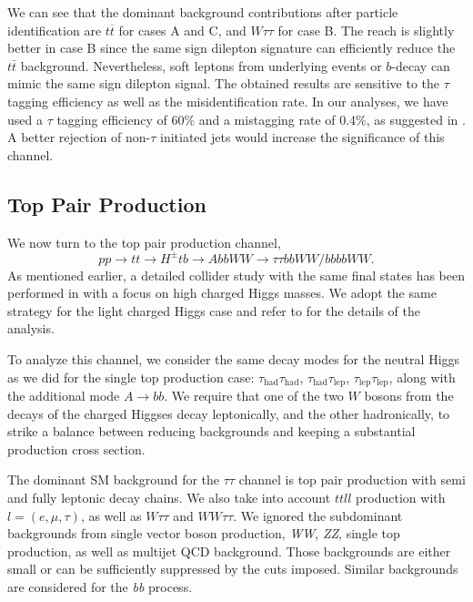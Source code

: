 We can see that the dominant background contributions after particle identification are $t\overline{t}$ for cases A and C, and $W\tau\tau$ for case B. The reach is slightly better in case B since the same sign dilepton signature can efficiently reduce the $t\bar{t}$ background. Nevertheless, soft leptons from underlying events or $b$-decay can mimic the same sign dilepton signal. The obtained results are sensitive to the $\tau$ tagging efficiency as well as the misidentification rate. In our analyses, we have used a $\tau$ tagging efficiency of 60\% and a mistagging rate of 0.4\%, as suggested in \cite{Anderson:2013kxz}. A better rejection of non-$\tau$ initiated jets would increase the significance of this channel. 

\subsection{Top Pair Production}
 \label{sec:light_charged_analysis_tt}

We now turn to the top pair production channel, 
\begin{equation}
pp \rightarrow tt \rightarrow H^{\pm} tb \rightarrow AbbWW\rightarrow \tau\tau bbWW/bbbbWW.
\end{equation} 
As mentioned earlier, a detailed collider study with the same final states has been performed in \cite{Coleppa:2014cca} with a focus on high charged Higgs masses. We adopt the same strategy for the light charged Higgs case and refer to \cite{Coleppa:2014cca} for the details of the analysis. 

To analyze this channel, we consider the same decay modes for the neutral Higgs as we did for the single top production case: $\tau_\text{had}\tau_\text{had}$, $\tau_\text{had}\tau_\text{lep}$, $\tau_\text{lep}\tau_\text{lep}$, along with the additional mode $A\rightarrow bb$. We require that one of the two $W$ bosons from the decays of the charged Higgses decay leptonically, and the other hadronically, to strike a balance between reducing backgrounds and keeping a substantial production cross section.
 
The dominant SM background for the $\tau\tau$ channel is top pair production with  semi and fully leptonic decay chains. We also take into account $ttll$ production with $l = (e, \mu, \tau)$, as well as $W\tau\tau$ and $WW\tau\tau$. We ignored the subdominant backgrounds from single vector boson production, \emph{WW}, \emph{ZZ}, single top production, as well as multijet QCD background. Those backgrounds are either small or can be sufficiently suppressed by the cuts imposed. Similar backgrounds are considered for the \emph{bb} process. 

